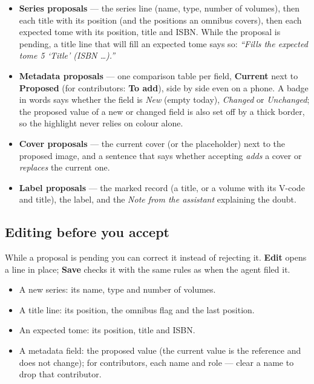 \begin{itemize}
  \item \textbf{Series proposals} --- the series line (name, type,
        number of volumes), then each title with its position (and
        the positions an omnibus covers), then each expected tome
        with its position, title and ISBN. While the proposal is
        pending, a title line that will fill an expected tome says so:
        \emph{``Fills the expected tome 5 `Title' (ISBN \dots).''}
  \item \textbf{Metadata proposals} --- one comparison table per
        field, \textbf{Current} next to \textbf{Proposed} (for
        contributors: \textbf{To add}), side by side even on a phone.
        A badge in words says whether the field is \emph{New} (empty
        today), \emph{Changed} or \emph{Unchanged}; the proposed value
        of a new or changed field is also set off by a thick border,
        so the highlight never relies on colour alone.
  \item \textbf{Cover proposals} --- the current cover (or the
        placeholder) next to the proposed image, and a sentence that
        says whether accepting \emph{adds} a cover or \emph{replaces}
        the current one.
  \item \textbf{Label proposals} --- the marked record (a title, or a
        volume with its V-code and title), the label, and the
        \emph{Note from the assistant} explaining the doubt.
\end{itemize}

\subsection{Editing before you accept}

While a proposal is pending you can correct it instead of rejecting
it. \textbf{Edit} opens a line in place; \textbf{Save} checks it with
the same rules as when the agent filed it.

\begin{itemize}
  \item A new series: its name, type and number of volumes.
  \item A title line: its position, the omnibus flag and the last
        position.
  \item An expected tome: its position, title and ISBN.
  \item A metadata field: the proposed value (the current value is
        the reference and does not change); for contributors, each
        name and role --- clear a name to drop that contributor.
\end{itemize}

